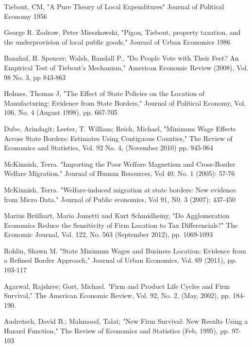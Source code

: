 \documentclass[11pt,a4paper]{article}\usepackage[]{graphicx}\usepackage[]{color}
\begin{document}
\begin{thebibliography}{99}

  Tiebout, CM, "A Pure Theory of Local Expenditures" Journal of Political Economy 1956

  George R. Zodrow, Peter Mieszkowski, "Pigou, Tiebout, property taxation, and the underprovision of local public goods," Journal of Urban Economics 1986

  Banzhaf, H. Spencer; Walsh, Randall P., "Do People Vote with Their Feet? An Empirical Test of Tiebout's Mechanism," American Economic Review (2008), Vol. 98 No. 3, pp 843-863

  Holmes, Thomas J, "The Effect of State Policies on the Location of Manufacturing: Evidence from State Borders," Journal of Political Economy, Vol. 106, No. 4 (August 1998), pp. 667-705

  Dube, Arindagit; Lester, T. William; Reich, Michael, "Minimum Wage Effects Across State Borders: Estimates Using Contiguous Counties," The Review of Economics and Statistics, Vol. 92 No. 4, (November 2010) pp. 945-964

McKinnish, Terra. "Importing the Poor Welfare Magnetism and Cross-Border Welfare Migration." Journal of Human Resources, Vol 40, No. 1 (2005): 57-76

McKinnish, Terra. "Welfare-induced migration at state borders: New evidence from Micro Data." Journal of Public economics, Vol 91, N0. 3 (2007): 437-450

  Marius Brülhart, Mario Jametti and Kurt Schmidheiny, "Do Agglomeration Economics Reduce the Sensitivity of Firm Location to Tax Differencials?" The Economic Journal, Vol. 122, No. 563 (September 2012), pp. 1069-1093

  Rohlin, Shawn M. "State Minimum Wages and Business Location: Evidence from a Refined Border Approach," Journal of Urban Economics, Vol. 69 (2011), pp. 103-117

  Agarwal, Rajshree; Gort, Michael. "Firm and Product Life Cycles and Firm Survival," The American Economic Review, Vol. 92, No. 2, (May, 2002), pp. 184-190.

  Audretsch, David B.; Mahmood, Talat; "New Firm Survival: New Results Using a Hazard Function," The Review of Economics and Statistics (Feb, 1995), pp. 97-103


\end{thebibliography}
\end{document}

